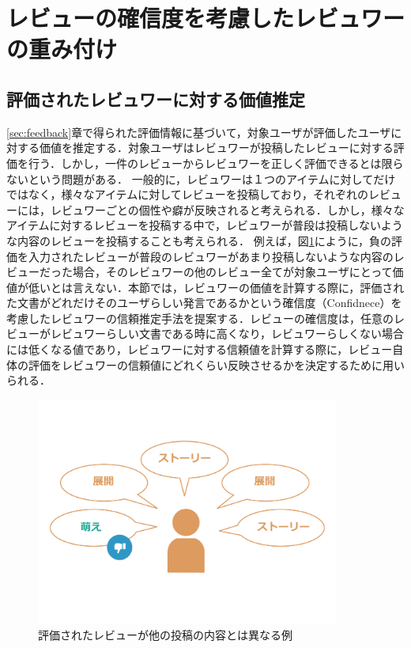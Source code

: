 \documentclass[a4paper,11pt,oneside,openany]{jsbook}
\begin{document}
	\section{レビューの確信度を考慮したレビュワーの重み付け}
	\label{sec:trust_weight}
		\subsection{評価されたレビュワーに対する価値推定}
\label{subsec:trust}
\ref{sec:feedback}章で得られた評価情報に基づいて，対象ユーザが評価したユーザに対する価値を推定する．対象ユーザはレビュワーが投稿したレビューに対する評価を行う．しかし，一件のレビューからレビュワーを正しく評価できるとは限らないという問題がある．%
一般的に，レビュワーは１つのアイテムに対してだけではなく，様々なアイテムに対してレビューを投稿しており，それぞれのレビューには，レビュワーごとの個性や癖が反映されると考えられる．しかし，様々なアイテムに対するレビューを投稿する中で，レビュワーが普段は投稿しないような内容のレビューを投稿することも考えられる．
例えば，図\ref{fig:conf}にように，負の評価を入力されたレビューが普段のレビュワーがあまり投稿しないような内容のレビューだった場合，そのレビュワーの他のレビュー全てが対象ユーザにとって価値が低いとは言えない．本節では，レビュワーの価値を計算する際に，評価された文書がどれだけそのユーザらしい発言であるかという確信度（Confidnece）を考慮したレビュワーの信頼推定手法を提案する．レビューの確信度は，任意のレビューがレビュワーらしい文書である時に高くなり，レビュワーらしくない場合には低くなる値であり，レビュワーに対する信頼値を計算する際に，レビュー自体の評価をレビュワーの信頼値にどれくらい反映させるかを決定するために用いられる．

\begin{figure}[tb]
	\begin{center} %
		\includegraphics[width = 100mm]{figures/confidence.pdf} %
	\end{center}
	\caption{評価されたレビューが他の投稿の内容とは異なる例} %
	\label{fig:conf} %
\end{figure}
\end{document}
